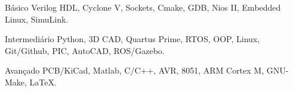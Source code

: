 

\begin{cvskills}

  \cvskill
    {Básico} %
    {Verilog HDL, Cyclone V, Sockets, Cmake, GDB, Nios II, Embedded Linux, SimuLink.} %

  \cvskill
    {Intermediário} %
    {Python, 3D CAD, Quartus Prime, RTOS, OOP, Linux, Git/Github, PIC, AutoCAD, ROS/Gazebo.} %

  \cvskill
    {Avançado} %
    {PCB/KiCad, Matlab, C/C++, AVR, 8051, ARM Cortex M, GNU-Make, LaTeX.}

\end{cvskills}




